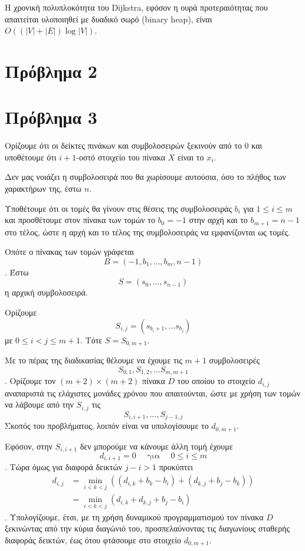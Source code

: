 \documentclass[12pt]{article}
\begin{document}
Η χρονική πολυπλοκότητα του Dijkstra, εφόσον η ουρά προτεραιότητας που απαιτείται υλοποιηθεί με δυαδικό σωρό (binary heap), είναι \(O((|V| + |E|)\log |V|)\). \hfill \blacksquare 

\newpage
\section*{Πρόβλημα 2 }

\newpage
\section*{Πρόβλημα 3} 
Ορίζουμε ότι οι δείκτες πινάκων και συμβολοσειρών ξεκινούν από το \(0\) και υποθέτουμε ότι \(i+1\)-οστό στοιχείο του πίνακα \(X\) είναι το \(x_i\).
\bigskip

Δεν μας νοιάζει η συμβολοσειρά που θα χωρίσουμε αυτούσια, όσο το πλήθος των χαρακτήρων της, έστω \(n\). 

Υποθέτουμε ότι οι τομές θα γίνουν στις θέσεις της συμβολοσειράς \(b_i\) για \(1 \leq i \leq m\) και προσθέτουμε στον πίνακα των τομών το \(b_0 = -1\) στην αρχή και το \(b_{m+1} = n-1\) στο τέλος, ώστε η αρχή και το τέλος της συμβολοσειράς να εμφανίζονται ως τομές. 

Οπότε ο πίνακας των τομών γράφεται 
\[
    B = (-1, b_1, \ldots, b_m, n-1)
\].
Έστω \[S = (s_0, \ldots, s_{n-1})\] η αρχική συμβολοσειρά. 

Ορίζουμε 
\[
    S_{i,j} = (s_{b_i+1},\ldots s_{b_j})
\] με \(0 \leq i < j \leq m+1\).
Tότε \(S = S_{0, m+1}\).

Με το πέρας της διαδικασίας θέλουμε να έχουμε τις \(m+1\) συμβολοσειρές 
\[
    S_{0,1}, S_{1,2}, \ldots S_{m, m+1}
\].
Ορίζουμε τον \((m+2) \times (m+2)\) πίνακα \(D\) του οποίου το στοιχείο \(d_{i,j}\) αναπαριστά τις ελάχιστες μονάδες χρόνου που απαιτούνται, ώστε με χρήση των τομών να λάβουμε από την \(S_{i, j}\) τις 
\[
    S_{i,i+1},\ldots, S_{j-1, j}\]
Σκοπός του προβλήματος, λοιπόν είναι να υπολογίσουμε το \(d_{0, m+1}\). 

Εφόσον, στην \(S_{i,i+1}\) δεν μπορούμε να κάνουμε άλλη τομή έχουμε 
\[
    d_{i,i+1} = 0 \quad \text{  για  }\quad 0 \leq i \leq m\].
Τώρα όμως για διαφορά δεικτών \(j - i > 1\) προκύπτει
\begin{align*}
    d_{i,j} &= \min_{i < k < j} \left( (d_{i,k} + b_k - b_i) + (d_{k,j} + b_j - b_k) \right) \\
            &= \min_{i < k < j} \left( d_{i,k}+ d_{k,j} + b_j - b_i \right)
\end{align*}
. Υπολογίζουμε, έτσι, με τη χρήση δυναμικού προγραμματισμού τον πίνακα \(D\) ξεκινώντας από την κύρια διαγώνιό του, προσπελαύνοντας τις διαγωνίους σταθερής διαφοράς δεικτών, έως ότου φτάσουμε στο στοιχείο \(d_{0, m+1}\). 
\end{document}
